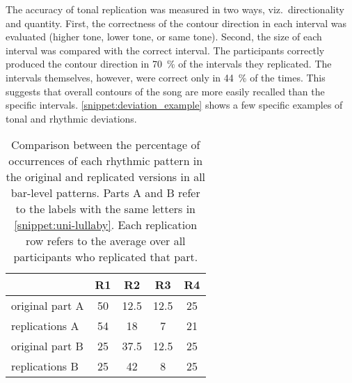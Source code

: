 The accuracy of tonal replication was measured in two ways, viz.\ directionality and quantity.
First, the correctness of the contour direction in each interval was evaluated (higher tone, lower tone, or same tone).
Second, the size of each interval was compared with the correct interval.
The participants correctly produced the contour direction in \SI{70}{\percent} of the intervals they replicated.
The intervals themselves, however, were correct only in \SI{44}{\percent} of the times.
This suggests that overall contours of the song are more easily recalled than the specific intervals.
\cref{snippet:deviation_example} shows a few specific examples of tonal and rhythmic deviations.

\begin{table}
	\caption[Percentages of rhythmic pattern replications]
		{Comparison between the percentage of occurrences of each rhythmic pattern in the original and replicated versions in all bar-level patterns.
		Parts A and B refer to the labels with the same letters in \cref{snippet:uni-lullaby}.
		Each replication row refers to the average over all participants who replicated that part.}
	\label{tab:neutral_rhythm_key}  
	\centering
	\begin{tabularx}{\linewidth}{XSSSS}
		\toprule
						& \bfseries{R1}		& \bfseries{R2}		& \bfseries{R3}		& \bfseries{R4}\\
		\midrule
		original part A	& 50				& 12.5				& 12.5				& 25\\
		replications A	& 54				& 18				& 7					& 21\\
		\rule{0pt}{0.5cm}%
		original part B	& 25				& 37.5				& 12.5				& 25\\
		replications B	& 25				& 42				& 8					& 25\\		
		\bottomrule
	\end{tabularx}
\end{table}


